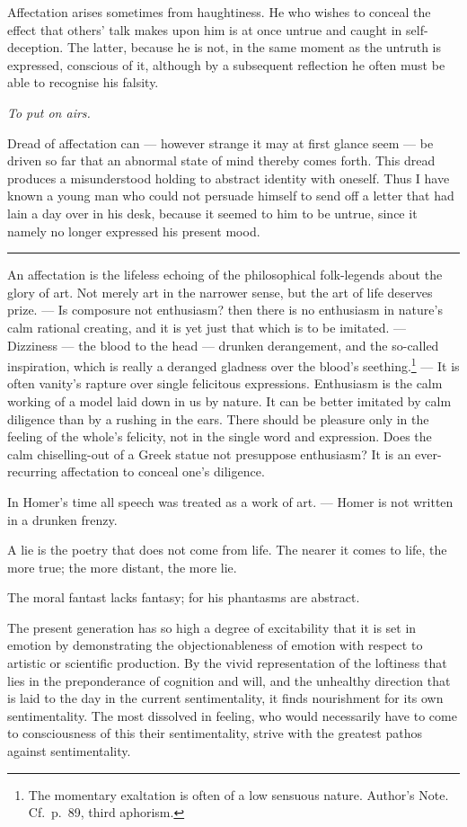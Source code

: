 \documentclass[12pt]{article}
\newcommand{\opage}[1]{\marginnote{\footnotesize\textit{[#1]}}}
\newcommand{\ombreak}{\par\medskip\begin{center}\rule{0.32\textwidth}{0.4pt}\end{center}\medskip}
\begin{document}
Affectation arises sometimes from haughtiness. He who wishes to conceal the effect that others' talk makes upon him is at once untrue and caught in self-deception. The latter, because he is not, in the same moment as the untruth is expressed, conscious of it, although by a subsequent reflection he often must be able to recognise his falsity.

\emph{To put on airs.}

Dread of affectation can --- however strange it may at first glance seem --- be driven so far that an abnormal state of mind thereby comes forth. This dread produces a misunderstood holding to abstract identity with oneself. Thus I have known a young man who could not persuade himself to send off a letter that had lain a day over in his desk, because it seemed to him to be untrue, since it namely no longer expressed his present mood.

\ombreak

\opage{182}An affectation is the lifeless echoing of the philosophical folk-legends about the glory of art. Not merely art in the narrower sense, but the art of life deserves prize. --- Is composure not enthusiasm? then there is no enthusiasm in nature's calm rational creating, and it is yet just that which is to be imitated. --- Dizziness --- the blood to the head --- drunken derangement, and the so-called inspiration, which is really a deranged gladness over the blood's seething.\footnote{The momentary exaltation is often of a low sensuous nature. Author's Note. Cf.\ p.\ 89, third aphorism.} --- It is often vanity's rapture over single felicitous expressions. Enthusiasm is the calm working of a model laid down in us by nature. It can be better imitated by calm diligence than by a rushing in the ears. There should be pleasure only in the feeling of the whole's felicity, not in the single word and expression. Does the calm chiselling-out of a Greek statue not presuppose enthusiasm? It is an ever-recurring affectation to conceal one's diligence.

In Homer's time all speech was treated as a work of art. --- Homer is not written in a drunken frenzy.

A lie is the poetry that does not come from life. The nearer it comes to life, the more true; the more distant, the more lie.

The moral fantast lacks fantasy; for his phantasms are abstract.

The present generation has so high a degree of excitability that it is set in emotion by demonstrating the objectionableness of emotion with respect to artistic or scientific production. By the vivid representation of the loftiness that lies in the preponderance of cognition and will, and the unhealthy \opage{183}direction that is laid to the day in the current sentimentality, it finds nourishment for its own sentimentality. The most dissolved in feeling, who would necessarily have to come to consciousness of this their sentimentality, strive with the greatest pathos against sentimentality.
\end{document}
